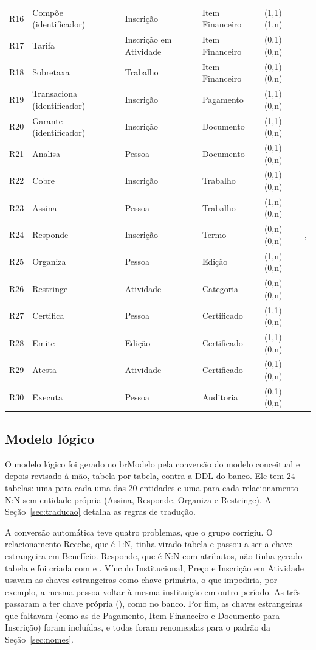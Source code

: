 {\begin{longtable}{@{}l L{3.0cm} L{2.3cm} L{2.3cm} L{1.8cm} L{2.6cm}@{}}
R16 & Compõe (identificador) & Inscrição & Item Financeiro & (1,1) (1,n) & \\
R17 & Tarifa & Inscrição em Atividade & Item Financeiro & (0,1) (0,n) & \\
R18 & Sobretaxa & Trabalho & Item Financeiro & (0,1) (0,n) & \\
R19 & Transaciona (identificador) & Inscrição & Pagamento & (1,1) (0,n) & \\
R20 & Garante (identificador) & Inscrição & Documento & (1,1) (0,n) & \\
R21 & Analisa & Pessoa & Documento & (0,1) (0,n) & \\
R22 & Cobre & Inscrição & Trabalho & (0,1) (0,n) & \\
R23 & Assina & Pessoa & Trabalho & (1,n) (0,n) & \\
R24 & Responde & Inscrição & Termo & (0,n) (0,n) & , \\
R25 & Organiza & Pessoa & Edição & (1,n) (0,n) & \\
R26 & Restringe & Atividade & Categoria & (0,n) (0,n) & \\
R27 & Certifica & Pessoa & Certificado & (1,1) (0,n) & \\
R28 & Emite & Edição & Certificado & (1,1) (0,n) & \\
R29 & Atesta & Atividade & Certificado & (0,1) (0,n) & \\
R30 & Executa & Pessoa & Auditoria & (0,1) (0,n) & \\
\end{longtable}
}

\subsection{Modelo lógico}
\label{sec:logico}

O modelo lógico foi gerado no brModelo pela conversão do modelo conceitual e depois revisado à mão, tabela por tabela, contra a DDL do banco. Ele tem 24 tabelas: uma para cada uma das 20 entidades e uma para cada relacionamento N:N sem entidade própria (Assina, Responde, Organiza e Restringe). A Seção~\ref{sec:traducao} detalha as regras de tradução.

A conversão automática teve quatro problemas, que o grupo corrigiu. O relacionamento Recebe, que é 1:N, tinha virado tabela e passou a ser a chave estrangeira  em Benefício. Responde, que é N:N com atributos, não tinha gerado tabela e foi criada com  e . Vínculo Institucional, Preço e Inscrição em Atividade usavam as chaves estrangeiras como chave primária, o que impediria, por exemplo, a mesma pessoa voltar à mesma instituição em outro período. As três passaram a ter chave própria (), como no banco. Por fim, as chaves estrangeiras que faltavam (como as de Pagamento, Item Financeiro e Documento para Inscrição) foram incluídas, e todas foram renomeadas para o padrão  da Seção~\ref{sec:nomes}.

